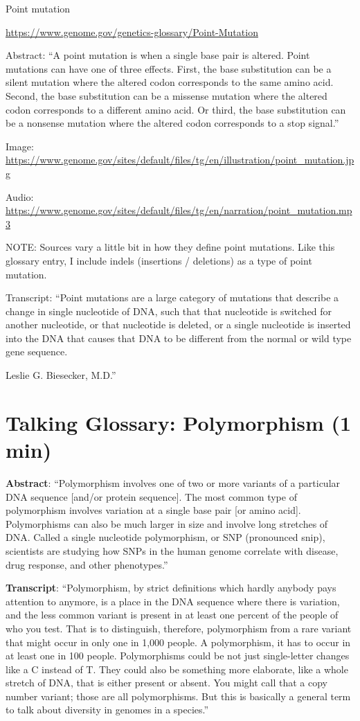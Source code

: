 \documentclass[
]{book}
\begin{document}
Point mutation

\url{https://www.genome.gov/genetics-glossary/Point-Mutation}

Abstract: ``A point mutation is when a single base pair is altered. Point mutations can have one of three effects. First, the base substitution can be a silent mutation where the altered codon corresponds to the same amino acid. Second, the base substitution can be a missense mutation where the altered codon corresponds to a different amino acid. Or third, the base substitution can be a nonsense mutation where the altered codon corresponds to a stop signal.''

Image: \url{https://www.genome.gov/sites/default/files/tg/en/illustration/point_mutation.jpg}

Audio: \url{https://www.genome.gov/sites/default/files/tg/en/narration/point_mutation.mp3}

NOTE: Sources vary a little bit in how they define point mutations. Like this glossary entry, I include indels (insertions / deletions) as a type of point mutation.

Transcript:
``Point mutations are a large category of mutations that describe a change in single nucleotide of DNA, such that that nucleotide is switched for another nucleotide, or that nucleotide is deleted, or a single nucleotide is inserted into the DNA that causes that DNA to be different from the normal or wild type gene sequence.

Leslie G. Biesecker, M.D.''

\hypertarget{talking-glossary-polymorphism-1-min}{%
\section{Talking Glossary: Polymorphism (1 min)}\label{talking-glossary-polymorphism-1-min}}

\textbf{Abstract}: ``Polymorphism involves one of two or more variants of a particular DNA sequence {[}and/or protein sequence{]}. The most common type of polymorphism involves variation at a single base pair {[}or amino acid{]}. Polymorphisms can also be much larger in size and involve long stretches of DNA. Called a single nucleotide polymorphism, or SNP (pronounced snip), scientists are studying how SNPs in the human genome correlate with disease, drug response, and other phenotypes.''

\textbf{Transcript}: ``Polymorphism, by strict definitions which hardly anybody pays attention to anymore, is a place in the DNA sequence where there is variation, and the less common variant is present in at least one percent of the people of who you test. That is to distinguish, therefore, polymorphism from a rare variant that might occur in only one in 1,000 people. A polymorphism, it has to occur in at least one in 100 people. Polymorphisms could be not just single-letter changes like a C instead of T. They could also be something more elaborate, like a whole stretch of DNA, that is either present or absent. You might call that a copy number variant; those are all polymorphisms. But this is basically a general term to talk about diversity in genomes in a species.''
\end{document}
